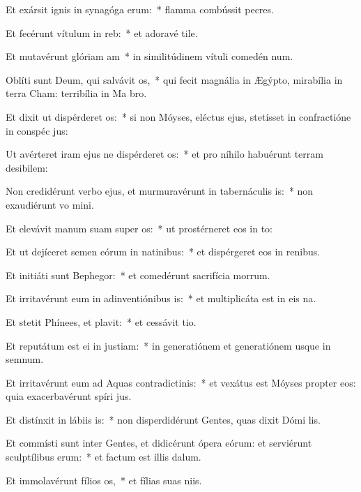 \item Et exársit ignis in synagóga erum:~* flamma combússit pecres.
\item Et fecérunt vítulum in reb:~* et adoravé tile.
\item Et mutavérunt glóriam am~* in similitúdinem vítuli comedén num.
\item Oblíti sunt Deum, qui salvávit os,~* qui fecit magnália in Ægýpto, mirabília in terra Cham: terribília in Ma bro.
\item Et dixit ut dispérderet os:~* si non Móyses, eléctus ejus, stetísset in confractióne in conspéc jus:
\item Ut avérteret iram ejus ne dispérderet os:~* et pro níhilo habuérunt terram desibilem:
\item Non credidérunt verbo ejus, et murmuravérunt in tabernáculis is:~* non exaudiérunt vo mini.
\item Et elevávit manum suam super os:~* ut prostérneret eos in to:
\item Et ut dejíceret semen eórum in natinibus:~* et dispérgeret eos in renibus.
\item Et initiáti sunt Bephegor:~* et comedérunt sacrifícia morrum.
\item Et irritavérunt eum in adinventiónibus is:~* et multiplicáta est in eis na.
\item Et stetit Phínees, et plavit:~* et cessávit tio.
\item Et reputátum est ei in justiam:~* in generatiónem et generatiónem usque in semnum.
\item Et irritavérunt eum ad Aquas contradictinis:~* et vexátus est Móyses propter eos: quia exacerbavérunt spíri jus.
\item Et distínxit in lábiis is:~* non disperdidérunt Gentes, quas dixit Dómi lis.
\item Et commísti sunt inter Gentes, et didicérunt ópera eórum: et serviérunt sculptílibus erum:~* et factum est illis  dalum.
\item Et immolavérunt fílios os,~* et fílias suas niis.
